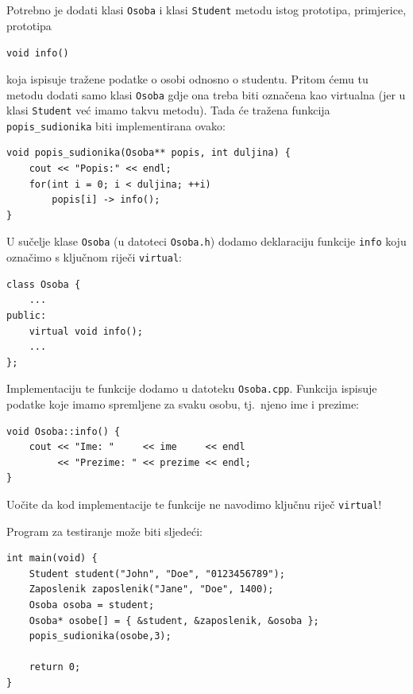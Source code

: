 \begin{rjesenje}
    Potrebno je dodati klasi \texttt{Osoba} i klasi \texttt{Student}
    metodu istog prototipa, primjerice, prototipa
    \begin{center}
        \texttt{void info()}
    \end{center}
    koja ispisuje tražene podatke o osobi odnosno o studentu.
    Pritom ćemu tu metodu dodati samo klasi \texttt{Osoba} gdje ona treba biti 
    označena kao virtualna
    (jer u klasi \texttt{Student} već imamo takvu metodu).
    Tada će tražena funkcija \texttt{popis\_sudionika} biti implementirana ovako:
    \begin{verbatim}
void popis_sudionika(Osoba** popis, int duljina) {
    cout << "Popis:" << endl;
    for(int i = 0; i < duljina; ++i)
        popis[i] -> info();
}
    \end{verbatim}

    U sučelje klase \texttt{Osoba} (u datoteci \texttt{Osoba.h}) dodamo deklaraciju funkcije \texttt{info} koju označimo s ključnom riječi \texttt{virtual}:

    \begin{verbatim}
class Osoba {
    ...
public:
    virtual void info();
    ...
};
    \end{verbatim}

    Implementaciju te funkcije dodamo u datoteku \texttt{Osoba.cpp}.
    Funkcija ispisuje podatke koje imamo spremljene za svaku osobu, tj.\ njeno ime i prezime:
\begin{verbatim}
void Osoba::info() {
    cout << "Ime: "     << ime     << endl 
         << "Prezime: " << prezime << endl;
}
\end{verbatim}
Uočite da kod implementacije te funkcije ne navodimo ključnu riječ \texttt{virtual}!

Program za testiranje može biti sljedeći:
\begin{verbatim}
int main(void) {
    Student student("John", "Doe", "0123456789");
    Zaposlenik zaposlenik("Jane", "Doe", 1400);
    Osoba osoba = student;
    Osoba* osobe[] = { &student, &zaposlenik, &osoba };
    popis_sudionika(osobe,3);

    return 0;
}
\end{verbatim}
\end{rjesenje}


